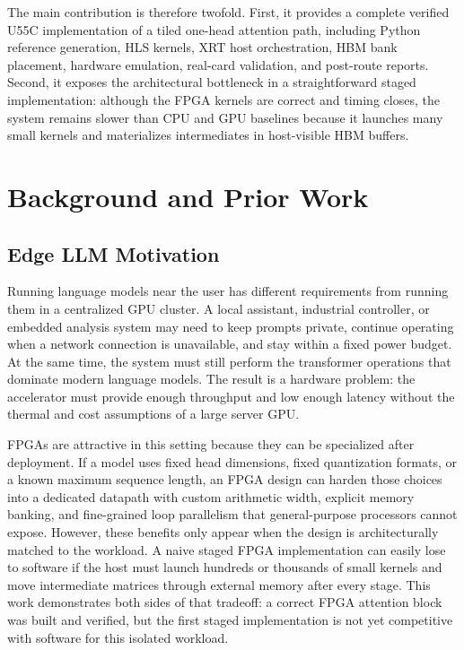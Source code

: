 \documentclass[conference]{IMSTemplate}
\begin{document}
The main contribution is therefore twofold. First, it provides a
complete verified U55C implementation of a tiled one-head attention path,
including Python reference generation, HLS kernels, XRT host orchestration, HBM
bank placement, hardware emulation, real-card validation, and post-route
reports. Second, it exposes the architectural bottleneck in a straightforward
staged implementation: although the FPGA kernels are correct and timing closes,
the system remains slower than CPU and GPU baselines because it launches many
small kernels and materializes intermediates in host-visible HBM buffers.

\section{Background and Prior Work}

\subsection{Edge LLM Motivation}

Running language models near the user has different requirements from running
them in a centralized GPU cluster. A local assistant, industrial controller, or
embedded analysis system may need to keep prompts private, continue operating
when a network connection is unavailable, and stay within a fixed power budget.
At the same time, the system must still perform the transformer operations that
dominate modern language models. The result is a hardware problem: the
accelerator must provide enough throughput and low enough latency without the
thermal and cost assumptions of a large server GPU.

FPGAs are attractive in this setting because they can be specialized after
deployment. If a model uses fixed head dimensions, fixed quantization formats,
or a known maximum sequence length, an FPGA design can harden those choices
into a dedicated datapath with custom arithmetic width, explicit memory banking,
and fine-grained loop parallelism that general-purpose processors cannot expose.
However, these benefits only appear when the design is architecturally matched
to the workload. A naive staged FPGA implementation can
easily lose to software if the host must launch hundreds or thousands of small
kernels and move intermediate matrices through external memory after every
stage. This work demonstrates both sides of that tradeoff: a correct FPGA attention
block was built and verified, but the first staged implementation is not yet
competitive with software for this isolated workload.
\end{document}
